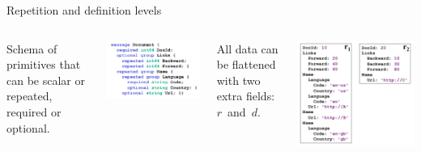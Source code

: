 \documentclass{beamer}
\begin{document}
\begin{frame}{Repetition and definition levels}
\vspace{0.5 cm}
\begin{columns}[T]
\small Schema of primitives that can be scalar or repeated, required or optional.

\vspace{0.2 cm}
\includegraphics[width=\linewidth]{repetition_and_definition_schema.png}

\vspace{0.1 cm}
All data can be flattened with two extra fields: \mbox{$r$ and $d$.\hspace{-1 cm}}

\vspace{-0.2 cm}

\includegraphics[width=\linewidth]{repetition_and_definition_data.png}
\end{columns}


\end{frame}
\end{document}
